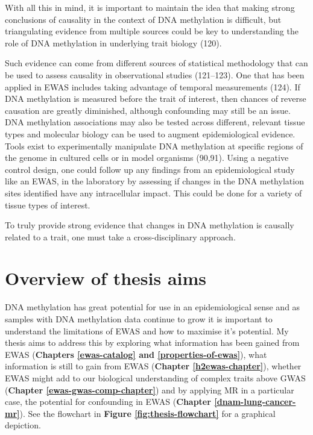\documentclass[11pt,oneside]{bristolthesis}
\begin{document}
With all this in mind, it is important to maintain the idea that making strong conclusions of causality in the context of DNA methylation is difficult, but triangulating evidence from multiple sources could be key to understanding the role of DNA methylation in underlying trait biology (120).

Such evidence can come from different sources of statistical methodology that can be used to assess causality in observational studies (121--123). One that has been applied in EWAS includes taking advantage of temporal measurements (124). If DNA methylation is measured before the trait of interest, then chances of reverse causation are greatly diminished, although confounding may still be an issue. DNA methylation associations may also be tested across different, relevant tissue types and molecular biology can be used to augment epidemiological evidence. Tools exist to experimentally manipulate DNA methylation at specific regions of the genome in cultured cells or in model organisms (90,91). Using a negative control design, one could follow up any findings from an epidemiological study like an EWAS, in the laboratory by assessing if changes in the DNA methylation sites identified have any intracellular impact. This could be done for a variety of tissue types of interest.

To truly provide strong evidence that changes in DNA methylation is causally related to a trait, one must take a cross-disciplinary approach.

\hypertarget{overview-of-thesis-aims}{%
\section{Overview of thesis aims}\label{overview-of-thesis-aims}}

DNA methylation has great potential for use in an epidemiological sense and as samples with DNA methylation data continue to grow it is important to understand the limitations of EWAS and how to maximise it's potential. My thesis aims to address this by exploring what information has been gained from EWAS (\textbf{Chapters \ref{ewas-catalog} and \ref{properties-of-ewas}}), what information is still to gain from EWAS (\textbf{Chapter \ref{h2ewas-chapter}}), whether EWAS might add to our biological understanding of complex traits above GWAS (\textbf{Chapter \ref{ewas-gwas-comp-chapter}}) and by applying MR in a particular case, the potential for confounding in EWAS (\textbf{Chapter \ref{dnam-lung-cancer-mr}}). See the flowchart in \textbf{Figure \ref{fig:thesis-flowchart}} for a graphical depiction.
\end{document}
